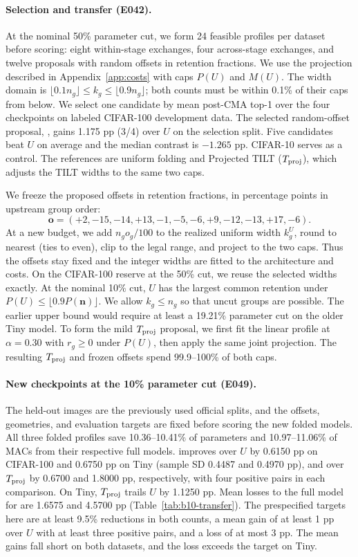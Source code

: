 \paragraph{Selection and transfer (E042).}
At the nominal 50\% parameter cut, we form 24 feasible profiles per dataset before scoring:
eight within-stage exchanges, four across-stage exchanges, and twelve
proposals with random offsets in retention fractions. We use the
projection described in Appendix~\ref{app:costs} with caps $P(U)$ and
$M(U)$. The width domain is
$\lfloor 0.1 n_g\rfloor\le k_g\le\lfloor 0.9 n_g\rfloor$; both counts
must be within 0.1\% of their caps from below. We select one candidate by
mean post-CMA top-1 over the four checkpoints on labeled CIFAR-100
development data. The selected random-offset proposal, \emph{\FrozenShort{}},
gains 1.175 pp (3/4) over $U$ on the selection split. Five candidates beat
$U$ on average and the median contrast is $-1.265$ pp. CIFAR-10 serves as
a control. The references are uniform folding and Projected TILT
($T_{\rm proj}$), which adjusts the TILT widths to the same two caps.

We freeze the proposed offsets in retention fractions, in percentage
points in upstream group order:
\[
 \mathbf o=(+2,-15,-14,+13,-1,-5,-6,+9,-12,-13,+17,-6).
\]
At a new budget, we add $n_g o_g/100$ to the realized uniform width
$k_g^U$, round to nearest (ties to even), clip to the legal range, and
project to the two caps. Thus the offsets stay fixed and the integer
widths are fitted to the architecture and costs. On the CIFAR-100
reserve at the 50\% cut, we reuse the selected widths exactly. At the
nominal 10\% cut, $U$ has the largest common retention under
$P(U)\le\lfloor 0.9P(\mathbf n)\rfloor$.
We allow $k_g\le n_g$ so that uncut groups are possible. The earlier
upper bound would require at least a 19.21\% parameter cut on the older
Tiny model. To form the mild $T_{\rm proj}$ proposal, we first fit the
linear profile at $\alpha=0.30$ with $r_g\ge 0$ under $P(U)$, then apply
the same joint projection. The resulting $T_{\rm proj}$ and frozen
offsets spend 99.9--100\% of both caps.

\paragraph{New checkpoints at the 10\% parameter cut (E049).}
The held-out images are the previously used official splits, and the
offsets, geometries, and evaluation targets are fixed before scoring the
new folded models. All three folded profiles save 10.36--10.41\% of
parameters and 10.97--11.06\% of MACs from their respective full models.
\FrozenShort{} improves over $U$ by 0.6150 pp on CIFAR-100
and 0.6750 pp on Tiny (sample SD 0.4487 and 0.4970 pp), and over $T_{\rm proj}$ by
0.6700 and 1.8000 pp, respectively, with four positive pairs in each
comparison. On Tiny, $T_{\rm proj}$ trails $U$ by 1.1250 pp. Mean losses
to the full model for \FrozenShort{} are 1.6575 and 4.5700 pp
(Table~\ref{tab:b10-transfer}). The prespecified targets here are at
least 9.5\% reductions in both counts, a mean gain of at least 1 pp over
$U$ with at least three positive pairs, and a loss of at most 3 pp. The
mean gains fall short on both datasets, and the loss exceeds the target
on Tiny.

